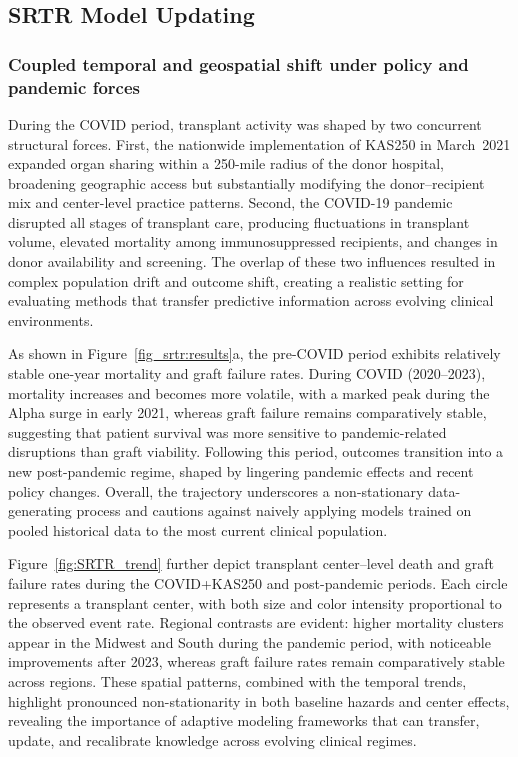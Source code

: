 \documentclass{article}
\theoremstyle{plain}
\theoremstyle{definition}
\theoremstyle{remark}
\begin{document}
\subsection{SRTR Model Updating}

\subsubsection{Coupled temporal and geospatial shift under policy and pandemic forces}
\label{A.SRTR1.Temporal}

During the COVID period, transplant activity was shaped by two concurrent structural forces.
First, the nationwide implementation of KAS250 in March~2021 expanded organ sharing within a 250-mile radius of the donor hospital, broadening geographic access but substantially modifying the donor–recipient mix and center-level practice patterns.
Second, the COVID-19 pandemic disrupted all stages of transplant care, producing fluctuations in transplant volume, elevated mortality among immunosuppressed recipients, and changes in donor availability and screening.
The overlap of these two influences resulted in complex population drift and outcome shift, creating a realistic setting for evaluating methods that transfer predictive information across evolving clinical environments.


As shown in Figure~\ref{fig_srtr:results}a, the pre-COVID period exhibits relatively stable one-year mortality and graft failure rates. During COVID (2020–2023), mortality increases and becomes more volatile, with a marked peak during the Alpha surge in early 2021, whereas graft failure remains comparatively stable, suggesting that patient survival was more sensitive to pandemic-related disruptions than graft viability. Following this period, outcomes transition into a new post-pandemic regime, shaped by lingering pandemic effects and recent policy changes. Overall, the trajectory underscores a non-stationary data-generating process and cautions against naively applying models trained on pooled historical data to the most current clinical population.

Figure~\ref{fig:SRTR_trend} further depict transplant center–level death and graft failure rates during the COVID+KAS250 and post-pandemic periods.  
Each circle represents a transplant center, with both size and color intensity proportional to the observed event rate.  
Regional contrasts are evident: higher mortality clusters appear in the Midwest and South during the pandemic period, with noticeable improvements after 2023, whereas graft failure rates remain comparatively stable across regions.  
These spatial patterns, combined with the temporal trends, highlight pronounced non-stationarity in both baseline hazards and center effects, revealing the importance of adaptive modeling frameworks that can transfer, update, and recalibrate knowledge across evolving clinical regimes.
\end{document}
